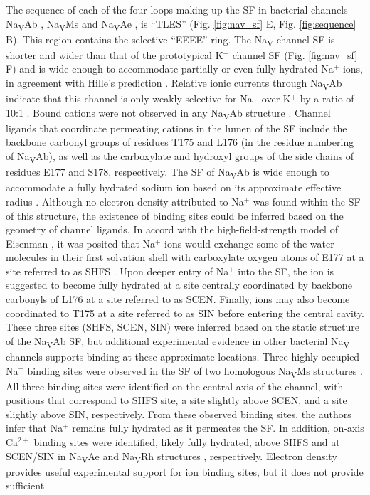 \begin{refsection}
The sequence of each of the four loops making up the SF in bacterial channels Na\textsubscript{V}Ab \cite{Payandeh:2012ib}, Na\textsubscript{V}Ms \cite{McCusker:2012di,Naylor:2016cu,Bagneris:2013bu,Sula:2017hu} and Na\textsubscript{V}Ae \cite{Shaya:2014gg,Arrigoni:2016fs}, is ``TLES'' (Fig. \ref{fig:nav_sf} E, Fig. \ref{fig:sequence} B). This region contains the selective ``EEEE'' ring. The Na\textsubscript{V} channel SF is shorter and wider than that of the prototypical K$^+$ channel SF (Fig. \ref{fig:nav_sf} F) \cite{Doyle:1998wq} and is wide enough to accommodate partially or even fully hydrated Na$^+$ ions, in agreement with Hille's prediction \cite{Hille:1971vq,Payandeh:2012ib}. Relative ionic currents through Na\textsubscript{V}Ab indicate that this channel is only weakly selective for Na$^+$ over K$^+$ by a ratio of 10:1 \cite{Payandeh:2012ib}. Bound cations were not observed in any Na\textsubscript{V}Ab structure \cite{Payandeh:2013ex,Payandeh:2012ib,Lenaeus:2017cy}. Channel ligands that coordinate permeating cations in the lumen of the SF include the backbone carbonyl groups of residues T175 and L176 (in the residue numbering of Na\textsubscript{V}Ab), as well as the carboxylate and hydroxyl groups of the side chains of residues E177 and S178, respectively. The SF of Na\textsubscript{V}Ab is wide enough to accommodate a fully hydrated sodium ion based on its approximate effective radius \cite{Payandeh:2012ib}. Although no electron density attributed to Na$^+$ was found within the SF of this structure, the existence of binding sites could be inferred based on the geometry of channel ligands. In accord with the high-field-strength model of Eisenman \cite{Eisenman:1983tc}, it was posited that Na$^+$ ions would exchange some of the water molecules in their first solvation shell with carboxylate oxygen atoms of E177 at a site referred to as SHFS \cite{Payandeh:2012ib}. Upon deeper entry of Na$^+$ into the SF, the ion is suggested to become fully hydrated at a site centrally coordinated by backbone carbonyls of L176 at a site referred to as SCEN. Finally, ions may also become coordinated to T175 at a site referred to as SIN before entering the central cavity. These three sites (SHFS, SCEN, SIN) were inferred based on the static structure of the Na\textsubscript{V}Ab SF, but additional experimental evidence in other bacterial Na\textsubscript{V} channels supports binding at these approximate locations. Three highly occupied Na$^+$ binding sites were observed in the SF of two homologous Na\textsubscript{V}Ms structures \cite{Naylor:2016cu,Sula:2017hu}. All three binding sites were identified on the central axis of the channel, with positions that correspond to SHFS site, a site slightly above SCEN, and a site slightly above SIN, respectively. From these observed binding sites, the authors infer that Na$^+$ remains fully hydrated as it permeates the SF. In addition, on-axis Ca$^{2+}$ binding sites were identified, likely fully hydrated, above SHFS and at SCEN/SIN in Na\textsubscript{V}Ae \cite{Shaya:2014gg} and Na\textsubscript{V}Rh structures \cite{Zhang:2013bz}, respectively. Electron density provides useful experimental support for ion binding sites, but it does not provide sufficient 
\end{refsection}
